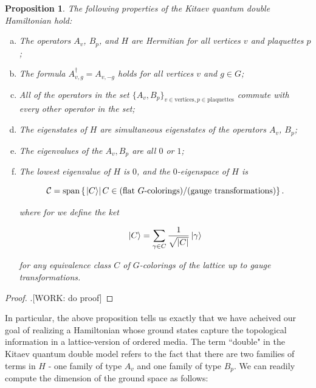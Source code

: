 \documentclass{article}
\newtheorem{proposition}{Proposition}[section]
\theoremstyle{definition}
\numberwithin{figure}{section}
\begin{document}
\begin{proposition} The following properties of the Kitaev quantum double Hamiltonian hold:

\begin{enumerate}[(a)]
\item The operators $A_v$, $B_p$, and $H$ are Hermitian for all vertices $v$ and plaquettes $p$;
\item The formula $A_{v,g}^{\dagger}=A_{v,-g}$ holds for all vertices $v$ and $g\in G$;
\item All of the operators in the set $\{A_v,B_p\}_{v\in \text{vertices}, p\in \text{plaquettes}}$ commute with every other operator in the set;
\item The eigenstates of $H$ are simultaneous eigenstates of the operators $A_v$, $B_p$;
\item The eigenvalues of the $A_v,B_p$ are all $0$ or $1$;
\item The lowest eigenvalue of $H$ is $0$, and the $0$-eigenspace of $H$ is

$$\mathcal{C}=\text{span}\left\{\left.\ket{C}\right| C\in \text{(flat $G$-colorings)}/\text{(gauge transformations)}\right\}.$$

where for we define the ket

$$\ket{C}=\sum_{\gamma \in C}\frac{1}{\sqrt{|C|}}\ket{\gamma}$$

for any equivalence class $C$ of $G$-colorings of the lattice up to gauge transformations.

\end{enumerate}
\end{proposition}
\begin{proof}.[WORK: do proof]
\end{proof}

In particular, the above proposition tells us exactly that we have acheived our goal of realizing a Hamiltonian whose ground states capture the topological information in a lattice-version of ordered media.  The term ``double" in the Kitaev quantum double model refers to the fact that there are two families of terms in $H$ - one family of type $A_v$ and one family of type $B_p$. We can readily compute the dimension of the ground space as follows:
\end{document}
